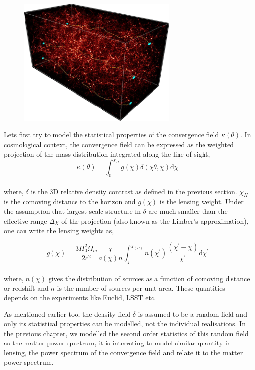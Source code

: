 \begin{figure}
	\centering
	\includegraphics[width=0.7\textwidth]{figures/weaklensing.png}
	\caption{}
	\label{fig:wl}
\end{figure}

Lets first try to model the statistical properties of the convergence field
$\kappa(\theta)$. In cosmological context, the convergence field can be expressed
as the weighted projection of the mass distribution integrated along the line of 
sight,
\begin{equation}
	\kappa(\theta) = \int_0^{\chi_H} g(\chi)\delta(\chi\theta,\chi) \mathrm{d}\chi
\end{equation}
\\
where, $\delta$ is the 3D relative density contrast as defined in the previous section.
$\chi_H$ is the comoving distance to the horizon and $g(\chi)$ is the lensing 
weight. Under the assumption that largest scale structure in $\delta$ are much smaller
than the effective range $\Delta \chi$ of the projection (also known as the Limber's 
approximation), one can write the lensing weights as,

\begin{equation}
	g(\chi) = \dfrac{3H_0^2\Omega_m}{2c^2} \dfrac{\chi}{a(\chi)\bar{n}} \int_{\chi}^{\chi_(H)}
					n(\chi^{\prime})
					\dfrac{(\chi^{\prime}-\chi)}{\chi^{\prime}}\mathrm{d}\chi^{\prime}
\end{equation}
\\
where, $n(\chi)$ gives the distribution of sources as a function of comoving distance or redshift
and $\bar{n}$ is the number of sources per unit area. These quantities depends on the
experiments like Euclid, LSST etc.

As mentioned earlier too, the density field $\delta$ is assumed to be a random field
and only its statistical properties can be modelled, not the individual realisations. 
In the previous chapter, we modelled the second order statistics of this random field
as the matter power spectrum, it is interesting to model similar quantity in lensing,
the power spectrum of the convergence field and relate it to the matter power spectrum.


